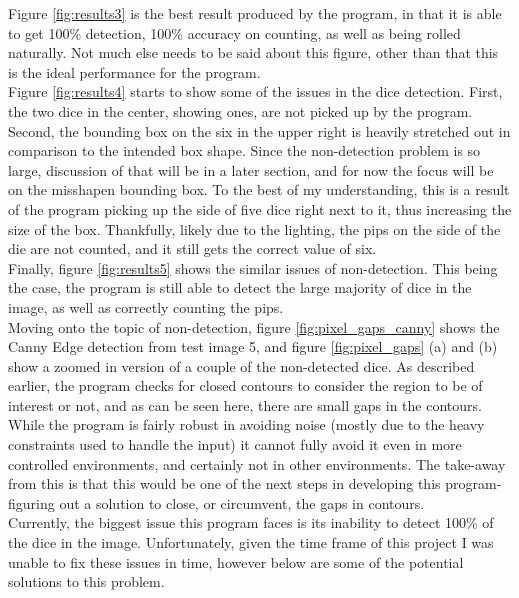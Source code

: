 \documentclass[journal]{IEEEtran}
\begin{document}
Figure \ref{fig:results3} is the best result produced by the program, in that it is able to get 100\% detection, 100\% accuracy on counting, as well as being rolled naturally. Not much else needs to be said about this figure, other than that this is the ideal performance for the program.\\

Figure \ref{fig:results4} starts to show some of the issues in the dice detection. First, the two dice in the center, showing ones, are not picked up by the program. Second, the bounding box on the six in the upper right is heavily stretched out in comparison to the intended box shape. Since the non-detection problem is so large, discussion of that will be in a later section, and for now the focus will be on the misshapen bounding box. To the best of my understanding, this is a result of the program picking up the side of five dice right next to it, thus increasing the size of the box. Thankfully, likely due to the lighting, the pips on the side of the die are not counted, and it still gets the correct value of six.\\

Finally, figure \ref{fig:results5} shows the similar issues of non-detection. This being the case, the program is still able to detect the large majority of dice in the image, as well as correctly counting the pips.\\

Moving onto the topic of non-detection, figure \ref{fig:pixel_gaps_canny} shows the Canny Edge detection from test image 5, and figure \ref{fig:pixel_gaps} (a) and (b) show a zoomed in version of a couple of the non-detected dice. As described earlier, the program checks for closed contours to consider the region to be of interest or not, and as can be seen here, there are small gaps in the contours. While the program is fairly robust in avoiding noise (mostly due to the heavy constraints used to handle the input) it cannot fully avoid it even in more controlled environments, and certainly not in other environments. The take-away from this is that this would be one of the next steps in developing this program- figuring out a solution to close, or circumvent, the gaps in contours.\\

Currently, the biggest issue this program faces is its inability to detect 100\% of the dice in the image. Unfortunately, given the time frame of this project I was unable to fix these issues in time, however below are some of the potential solutions to this problem.
\end{document}

